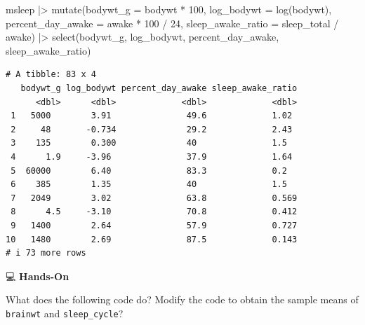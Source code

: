 \documentclass[
  letterpaper,
  DIV=11,
  numbers=noendperiod]{scrreprt}
\newenvironment{Shaded}{\begin{snugshade}}{\end{snugshade}}
\newcommand{\AttributeTok}[1]{\textcolor[rgb]{0.40,0.45,0.13}{#1}}
\newcommand{\DecValTok}[1]{\textcolor[rgb]{0.68,0.00,0.00}{#1}}
\newcommand{\FunctionTok}[1]{\textcolor[rgb]{0.28,0.35,0.67}{#1}}
\newcommand{\NormalTok}[1]{\textcolor[rgb]{0.00,0.23,0.31}{#1}}
\newcommand{\SpecialCharTok}[1]{\textcolor[rgb]{0.37,0.37,0.37}{#1}}
\begin{document}
\begin{tcolorbox}[enhanced jigsaw, colbacktitle=quarto-callout-tip-color!10!white, opacitybacktitle=0.6, breakable, left=2mm, leftrule=.75mm, toprule=.15mm, toptitle=1mm, bottomtitle=1mm, colframe=quarto-callout-tip-color-frame, opacityback=0, coltitle=black, arc=.35mm, titlerule=0mm, colback=white, bottomrule=.15mm, title=\textcolor{quarto-callout-tip-color}{\faLightbulb}\hspace{0.5em}{Answer}, rightrule=.15mm]

\begin{Shaded}
\begin{Highlighting}[]
\NormalTok{msleep }\SpecialCharTok{|\textgreater{}}
  \FunctionTok{mutate}\NormalTok{(}\AttributeTok{bodywt\_g =}\NormalTok{ bodywt }\SpecialCharTok{*} \DecValTok{100}\NormalTok{,}
         \AttributeTok{log\_bodywt =} \FunctionTok{log}\NormalTok{(bodywt),}
         \AttributeTok{percent\_day\_awake =}\NormalTok{ awake }\SpecialCharTok{*} \DecValTok{100} \SpecialCharTok{/} \DecValTok{24}\NormalTok{,}
         \AttributeTok{sleep\_awake\_ratio =}\NormalTok{ sleep\_total }\SpecialCharTok{/}\NormalTok{ awake) }\SpecialCharTok{|\textgreater{}}
  \FunctionTok{select}\NormalTok{(bodywt\_g, log\_bodywt, percent\_day\_awake, sleep\_awake\_ratio)}
\end{Highlighting}
\end{Shaded}

\begin{verbatim}
# A tibble: 83 x 4
   bodywt_g log_bodywt percent_day_awake sleep_awake_ratio
      <dbl>      <dbl>             <dbl>             <dbl>
 1   5000        3.91               49.6             1.02 
 2     48       -0.734              29.2             2.43 
 3    135        0.300              40               1.5  
 4      1.9     -3.96               37.9             1.64 
 5  60000        6.40               83.3             0.2  
 6    385        1.35               40               1.5  
 7   2049        3.02               63.8             0.569
 8      4.5     -3.10               70.8             0.412
 9   1400        2.64               57.9             0.727
10   1480        2.69               87.5             0.143
# i 73 more rows
\end{verbatim}

\end{tcolorbox}

💻 \textbf{Hands-On}

What does the following code do? Modify the code to obtain the sample
means of \texttt{brainwt} and \texttt{sleep\_cycle}?
\end{document}
